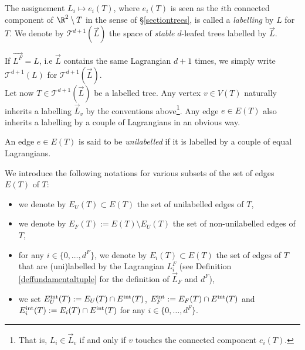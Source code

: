 \begin{dfn}
	The assignement $L_i\mapsto e_i(T)$, where $e_i(T)$ is seen as the $i$th connected component of $\R^2\setminus T$ in the sense of \S \ref{sectiontrees}, is called a \textit{labelling} by $L$ for $T$. We denote by $\mathcal{T}^{d+1}(\vec{L})$ the space of \textit{stable} $d$-leafed trees labelled by $\vec{L}$.
\end{dfn} 
\noindent If $\vec{L^F}={L}$, i.e $\vec{L}$ contains the same Lagrangian $d+1$ times, we simply write $\mathcal{T}^{d+1}(L)$ for $\mathcal{T}^{d+1}(\vec{L})$. \\
Let now $T\in \mathcal{T}^{d+1}(\vec{L})$ be a labelled tree. Any vertex $v\in V(T)$ naturally inherits a labelling $\vec{L}_v$ by the conventions above\footnote{ That is, $L_i\in \vec{L}_v$ if and only if $v$ touches the connected component $e_i(T)$.}. Any edge $e\in E(T)$ also inherits a labelling by a couple of Lagrangians in an obvious way.
\begin{dfn}
	An edge $e\in E(T)$ is said to be \textit{unilabelled} if it is labelled by a couple of equal Lagrangians. 
\end{dfn}
\noindent We introduce the following notations for various subsets of the set of edges $E(T)$ of $T$:
\begin{itemize}
	\item we denote by $E_U(T)\subset E(T)$ the set of unilabelled edges of $T$,
	\item we denote by $E_F(T):=E(T)\setminus E_U(T)$ the set of non-unilabelled edges of $T$,
	\item for any $i\in\{0,\ldots, d^F\}$, we denote by $E_i(T)\subset E(T)$ the set of edges of $T$ that are (uni)labelled by the Lagrangian $L_i^F$ (see Definition \ref{deffundamentaltuple} for the definition of $\vec{L}_F$ and $d^F$),
	\item we set $E_U^\textnormal{int}(T):=E_U(T)\cap E^\textnormal{int}(T)$, $E_F^\textnormal{int}:=E_F(T)\cap E^\textnormal{int}(T)$ and $E_i^\textnormal{int}(T):=E_i(T)\cap E^\textnormal{int}(T)$ for any $i\in \{0,\ldots, d^F\}$.
\end{itemize}

